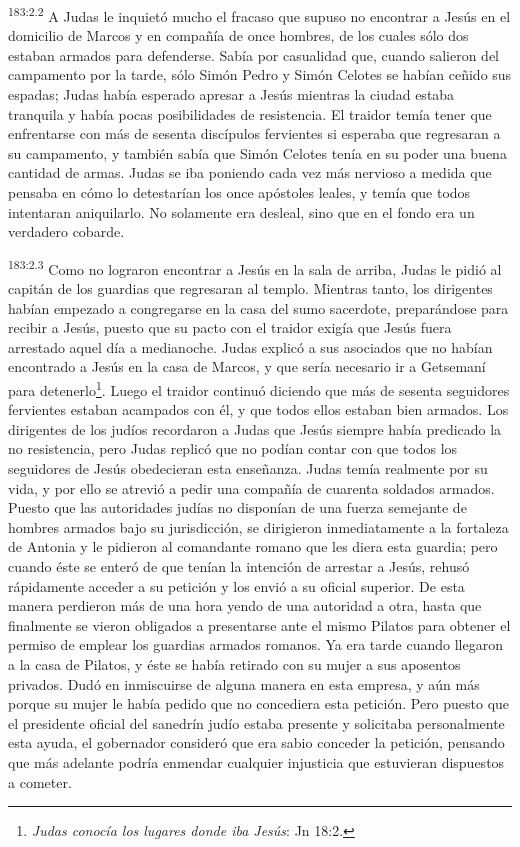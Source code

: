 \par
\textsuperscript{183:2.2} A Judas le inquietó mucho el fracaso que supuso no encontrar a Jesús en el domicilio de Marcos y en compañía de once hombres, de los cuales sólo dos estaban armados para defenderse. Sabía por casualidad que, cuando salieron del campamento por la tarde, sólo Simón Pedro y Simón Celotes se habían ceñido sus espadas; Judas había esperado apresar a Jesús mientras la ciudad estaba tranquila y había pocas posibilidades de resistencia. El traidor temía tener que enfrentarse con más de sesenta discípulos fervientes si esperaba que regresaran a su campamento, y también sabía que Simón Celotes tenía en su poder una buena cantidad de armas. Judas se iba poniendo cada vez más nervioso a medida que pensaba en cómo lo detestarían los once apóstoles leales, y temía que todos intentaran aniquilarlo. No solamente era desleal, sino que en el fondo era un verdadero cobarde.

\par
\textsuperscript{183:2.3} Como no lograron encontrar a Jesús en la sala de arriba, Judas le pidió al capitán de los guardias que regresaran al templo. Mientras tanto, los dirigentes habían empezado a congregarse en la casa del sumo sacerdote, preparándose para recibir a Jesús, puesto que su pacto con el traidor exigía que Jesús fuera arrestado aquel día a medianoche. Judas explicó a sus asociados que no habían encontrado a Jesús en la casa de Marcos, y que sería necesario ir a Getsemaní para detenerlo\footnote{\textit{Judas conocía los lugares donde iba Jesús}: Jn 18:2.}. Luego el traidor continuó diciendo que más de sesenta seguidores fervientes estaban acampados con él, y que todos ellos estaban bien armados. Los dirigentes de los judíos recordaron a Judas que Jesús siempre había predicado la no resistencia, pero Judas replicó que no podían contar con que todos los seguidores de Jesús obedecieran esta enseñanza. Judas temía realmente por su vida, y por ello se atrevió a pedir una compañía de cuarenta soldados armados. Puesto que las autoridades judías no disponían de una fuerza semejante de hombres armados bajo su jurisdicción, se dirigieron inmediatamente a la fortaleza de Antonia y le pidieron al comandante romano que les diera esta guardia; pero cuando éste se enteró de que tenían la intención de arrestar a Jesús, rehusó rápidamente acceder a su petición y los envió a su oficial superior. De esta manera perdieron más de una hora yendo de una autoridad a otra, hasta que finalmente se vieron obligados a presentarse ante el mismo Pilatos para obtener el permiso de emplear los guardias armados romanos. Ya era tarde cuando llegaron a la casa de Pilatos, y éste se había retirado con su mujer a sus aposentos privados. Dudó en inmiscuirse de alguna manera en esta empresa, y aún más porque su mujer le había pedido que no concediera esta petición. Pero puesto que el presidente oficial del sanedrín judío estaba presente y solicitaba personalmente esta ayuda, el gobernador consideró que era sabio conceder la petición, pensando que más adelante podría enmendar cualquier injusticia que estuvieran dispuestos a cometer.

